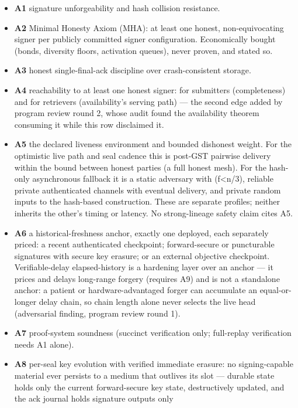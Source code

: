 \documentclass[
  11pt,
]{article}
\providecommand{\tightlist}{%
  \setlength{\itemsep}{0pt}\setlength{\parskip}{0pt}}
\begin{document}
\begin{itemize}
\tightlist
\item
  \textbf{A1} signature unforgeability and hash collision resistance.
\item
  \textbf{A2} Minimal Honesty Axiom (MHA): at least one honest,
  non-equivocating signer per publicly committed signer configuration.
  Economically bought (bonds, diversity floors, activation queues), never
  proven, and stated so.
\item
  \textbf{A3} honest single-final-ack discipline over crash-consistent
  storage.
\item
  \textbf{A4} reachability to at least one honest signer: for submitters
  (completeness) and for retrievers (availability's serving path) — the
  second edge added by program review round 2, whose audit found the
  availability theorem consuming it while this row disclaimed it.
\item
  \textbf{A5} the declared liveness environment and bounded dishonest
  weight. For the optimistic live path and seal cadence this is post-GST
  pairwise delivery within the bound between honest parties (a full honest
  mesh). For the hash-only asynchronous fallback it is a static adversary
  with (f<n/3), reliable private authenticated channels with eventual
  delivery, and private random inputs to the hash-based construction. These
  are separate profiles; neither inherits the other's timing or latency.
  No strong-lineage safety claim cites A5.
\item
  \textbf{A6} a historical-freshness anchor, exactly one deployed, each
  separately priced: a recent authenticated checkpoint; forward-secure or
  puncturable signatures with secure key erasure; or an external objective
  checkpoint. Verifiable-delay elapsed-history is a hardening layer over
  an anchor — it prices and delays long-range forgery (requires A9) and is
  not a standalone anchor: a patient or hardware-advantaged forger can
  accumulate an equal-or-longer delay chain, so chain length alone never
  selects the live head (adversarial finding, program review round 1).
\item
  \textbf{A7} proof-system soundness (succinct verification only;
  full-replay verification needs A1 alone).
\item
  \textbf{A8} per-seal key evolution with verified immediate erasure:
  no signing-capable material ever persists to a medium that outlives its
  slot — durable state holds only the current forward-secure key state,
  destructively updated, and the ack journal holds signature outputs only

\end{itemize}
\end{document}
